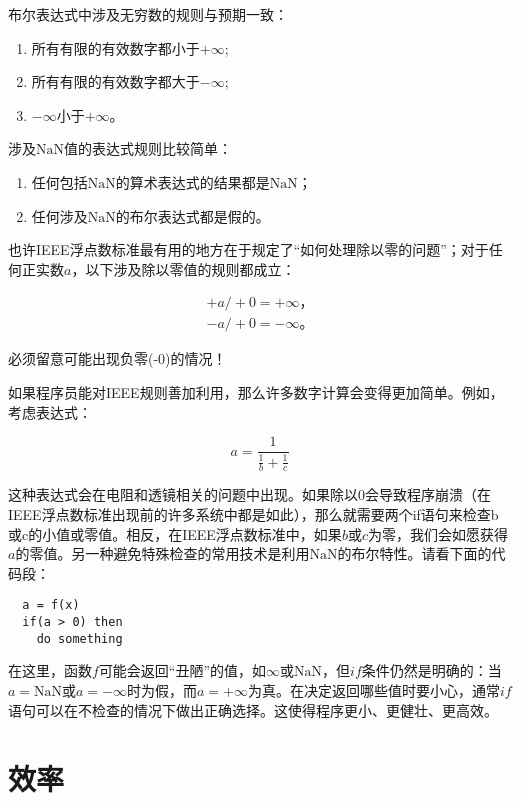 \documentclass[lang=cn,12pt]{elegantbook}
\begin{document}
布尔表达式中涉及无穷数的规则与预期一致：

\begin{enumerate}
  \item 所有有限的有效数字都小于$+\infty$;
  \item 所有有限的有效数字都大于$-\infty$;
  \item $-\infty$小于$+\infty$。
\end{enumerate}

涉及$\mathrm{NaN}$值的表达式规则比较简单：

\begin{enumerate}
  \item 任何包括$\mathrm{NaN}$的算术表达式的结果都是$\mathrm{NaN}$；
  \item 任何涉及$\mathrm{NaN}$的布尔表达式都是假的。
\end{enumerate}

也许IEEE浮点数标准最有用的地方在于规定了“如何处理除以零的问题”；对于任何正实数$a$，以下涉及除以零值的规则都成立：

\[
  \begin{aligned}
  +a /+0=+\infty， \\
  -a /+0=-\infty。
  \end{aligned}
\]

\begin{note}
必须留意可能出现负零(-0)的情况！
\end{note}

如果程序员能对IEEE规则善加利用，那么许多数字计算会变得更加简单。例如，考虑表达式：

\[a=\frac{1}{\frac{1}{b}+\frac{1}{c}}\]

这种表达式会在电阻和透镜相关的问题中出现。如果除以0会导致程序崩溃（在IEEE浮点数标准出现前的许多系统中都是如此），那么就需要两个if语句来检查b或c的小值或零值。相反，在IEEE浮点数标准中，如果$b$或$c$为零，我们会如愿获得$a$的零值。另一种避免特殊检查的常用技术是利用$\mathrm{NaN}$的布尔特性。请看下面的代码段：

\begin{lstlisting}
  a = f(x)
  if(a > 0) then
    do something
\end{lstlisting}

在这里，函数$f$可能会返回“丑陋”的值，如$\infty$或$\mathrm{NaN}$，但$if$条件仍然是明确的：当$a=\mathrm{NaN}$或$a=-\infty$时为假，而$a=+\infty$为真。在决定返回哪些值时要小心，通常$if$语句可以在不检查的情况下做出正确选择。这使得程序更小、更健壮、更高效。

\section{效率}
\end{document}
